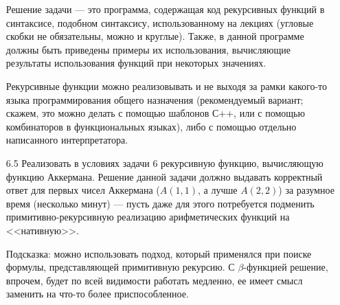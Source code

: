 \documentclass[11pt,a4paper,oneside]{book}
\begin{document}
\begin{enumerate}
Решение задачи --- это программа, содержащая код рекурсивных функций в синтаксисе, 
подобном синтаксису, использованному на лекциях (угловые скобки не обязательны,
можно и круглые). Также, в данной
программе должны быть приведены примеры их использования, вычисляющие результаты
использования функций при некоторых значениях.

Рекурсивные функции можно реализовывать и не выходя за рамки какого-то языка программирования
общего назначения (рекомендуемый вариант; скажем, это можно делать с помощью шаблонов С++, 
или с помощью комбинаторов в функциональных языках), либо с помощью отдельно написанного 
интерпретатора.

\item[6.5] Реализовать в условиях задачи 6 рекурсивную функцию, вычисляющую функцию Аккермана.
Решение данной задачи должно выдавать корректный ответ для первых чисел Аккермана 
($A(1,1)$, а лучше $A(2,2)$) за разумное время (несколько минут) --- пусть даже для этого
потребуется подменить примитивно-рекурсивную реализацию арифметических функций на <<нативную>>. 

Подсказка: можно использовать подход, который применялся при поиске формулы, представляющей
примитивную рекурсию. С $\beta$-функцией решение, впрочем, будет по всей видимости работать 
медленно, ее имеет смысл заменить на что-то более приспособленное.

\end{enumerate}
\end{document}
